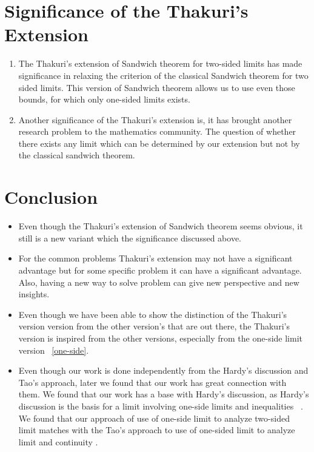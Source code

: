 \documentclass[a4paper,twoside,12pt]{article}
\theoremstyle{plain}
\theoremstyle{definition}
\theoremstyle{theorem}
\begin{document}
{\section{Significance of the Thakuri's Extension}
\begin{enumerate}
\item The Thakuri's extension of Sandwich theorem for two-sided limits has made significance in relaxing the criterion of the classical Sandwich theorem for two sided limits. This version of Sandwich theorem allows us to use even those bounds, for which only one-sided limits exists.

\item Another significance of the Thakuri's extension is, it has brought another research problem to the mathematics community. The question of whether there exists any limit which can be determined by our extension but not by the classical sandwich theorem.

\end{enumerate}

\section{Conclusion}
\begin{itemize}
\item Even though the Thakuri's extension of Sandwich theorem seems obvious, it still is a new variant which the significance discussed above.

\item For the common problems Thakuri's extension may not have a significant advantage but for some specific problem it can have a significant advantage. Also, having a new way to solve problem can give new perspective and new insights.

\item Even though we have been able to show the distinction of the Thakuri's version version from the other version's that are out there, the Thakuri's version is inspired from the other versions, especially from the one-side limit version ~\ref{one-side}.

\item Even though our work is done independently from the Hardy's discussion and Tao's approach, later we found that our work has great connection with them. We found that our work has a base with Hardy's discussion, as Hardy's discussion is the basis for a limit involving one-side limits and inequalities ~\cite{hardy}. We found that our approach of use of one-side limit to analyze two-sided limit matches with the Tao's approach to use of one-sided limit to analyze limit and continuity \cite{tao}.
\end{itemize}

}
\end{document}
